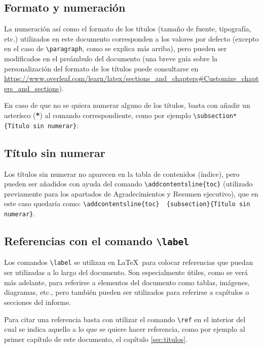 \documentclass[a4paper, 11pt, spanish, twoside]{article}
\begin{document}
\subsection{Formato y numeración}

La numeración así como el formato de los títulos (tamaño de fuente, tipografía, etc.) utilizados en este documento corresponden a los valores por defecto (excepto en el caso de \texttt{\textbackslash paragraph}, como se explica más arriba), pero pueden ser modificados en el preámbulo del documento (una breve guía sobre la personalización del formato de los títulos puede consultarse en \url{https://www.overleaf.com/learn/latex/sections_and_chapters#Customize_chapters_and_sections}). 

En caso de que no se quiera numerar alguno de los títulos, basta con añadir un asterísco (\textbf{*}) al comando correspondiente, como por ejemplo \texttt{\textbackslash subsection*\{Título sin numerar\}}:


\subsection*{Título sin numerar} 

Los títulos sin numerar no aparecen en la tabla de contenidos (índice), pero pueden ser añadidos con ayuda del comando \texttt{\textbackslash addcontentsline\{toc\}} (utilizado previamente para los apartados de Agradecimientos y Resumen ejecutivo), que en este caso quedaría como: \texttt{\textbackslash addcontentsline\{toc\} \ \{subsection\}\{Título sin numerar\}}.


\subsection{Referencias con el comando \texttt{\textbackslash label}} \label{sec:referencias}

Los comandos \texttt{\textbackslash label} se utilizan en \LaTeX \ para colocar referencias que puedan ser utilizadas a lo largo del documento. Son especialmente útiles, como se verá más adelante, para referirse a elementos del documento como tablas, imágenes, diagramas, etc., pero también pueden ser utilizados para referirse a capítulos o secciones del informe. 

Para citar una referencia basta con utilizar el comando \texttt{\textbackslash ref} en el interior del cual se indica aquello a lo que se quiere hacer referencia, como por ejemplo al primer capítulo de este documento, el capítulo \ref{sec:titulos}.
\end{document}
